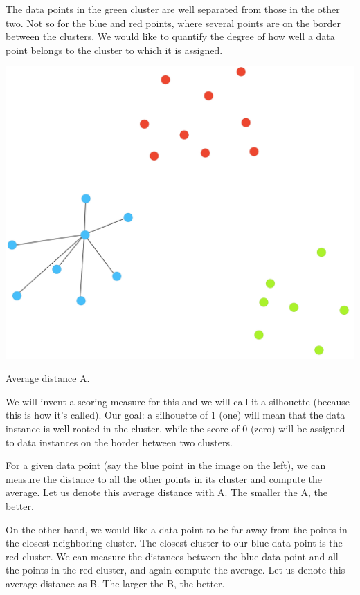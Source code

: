 The data points in the green cluster are well separated from those in the other two. Not so for the blue and red points, where several points are on the border between the clusters. We would like to quantify the degree of how well a data point belongs to the cluster to which it is assigned.

\begin{marginfigure}
    \centering
    \includegraphics[scale=0.25]{silhouette-pt1.png}
    \caption{Average distance A.}
\end{marginfigure}

We will invent a scoring measure for this and we will call it a silhouette (because this is how it's called). Our goal: a silhouette of 1 (one) will mean that the data instance is well rooted in the cluster, while the score of 0 (zero) will be assigned to data instances on the border between two clusters.

For a given data point (say the blue point in the image on the left), we can measure the distance to all the other points in its cluster and compute the average. Let us denote this average distance with A. The smaller the A, the better.

On the other hand, we would like a data point to be far away from the points in the closest neighboring cluster. The closest cluster to our blue data point is the red cluster. We can measure the distances between the blue data point and all the points in the red cluster, and again compute the average. Let us denote this average distance as B. The larger the B, the better.


